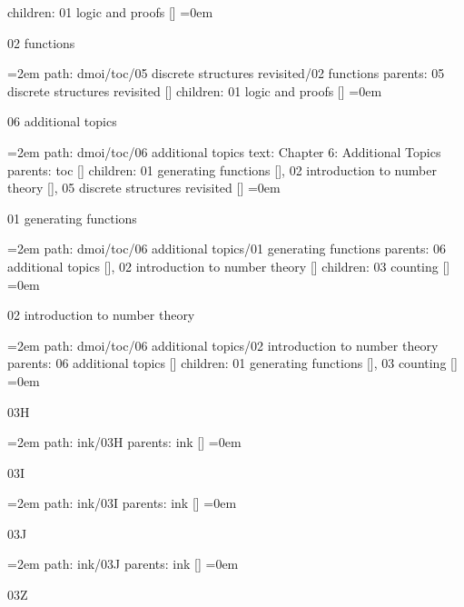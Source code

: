 \smallskip
children: 01 logic and proofs []
\smallskip
\leftskip=0em
\par\endgroup
\bigskip
{}
02 functions
\smallskip
\par\begingroup
\leftskip=2em
path: dmoi/toc/05 discrete structures revisited/02 functions
\smallskip
parents:  05 discrete structures revisited []
\smallskip
children: 01 logic and proofs []
\smallskip
\leftskip=0em
\par\endgroup
\bigskip
{}
06 additional topics
\smallskip
\par\begingroup
\leftskip=2em
path: dmoi/toc/06 additional topics
\smallskip
text:  Chapter 6: Additional Topics
\smallskip
parents:  toc []
\smallskip
children: 01 generating functions [], 02 introduction to number theory [], 05 discrete structures revisited []
\smallskip
\leftskip=0em
\par\endgroup
\bigskip
{}
01 generating functions
\smallskip
\par\begingroup
\leftskip=2em
path: dmoi/toc/06 additional topics/01 generating functions
\smallskip
parents:  06 additional topics [], 02 introduction to number theory []
\smallskip
children: 03 counting []
\smallskip
\leftskip=0em
\par\endgroup
\bigskip
{}
02 introduction to number theory
\smallskip
\par\begingroup
\leftskip=2em
path: dmoi/toc/06 additional topics/02 introduction to number theory
\smallskip
parents:  06 additional topics []
\smallskip
children: 01 generating functions [], 03 counting []
\smallskip
\leftskip=0em
\par\endgroup
\bigskip
{}
03H
\smallskip
\par\begingroup
\leftskip=2em
path: ink/03H
\smallskip
parents:  ink []
\smallskip
\leftskip=0em
\par\endgroup
\bigskip
{}
03I
\smallskip
\par\begingroup
\leftskip=2em
path: ink/03I
\smallskip
parents:  ink []
\smallskip
\leftskip=0em
\par\endgroup
\bigskip
{}
03J
\smallskip
\par\begingroup
\leftskip=2em
path: ink/03J
\smallskip
parents:  ink []
\smallskip
\leftskip=0em
\par\endgroup
\bigskip
{}
03Z
\smallskip
\par\begingroup
